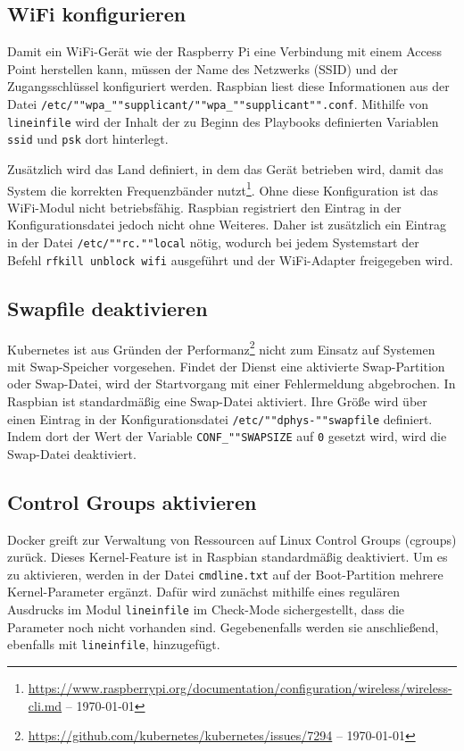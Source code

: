 \subsection{WiFi konfigurieren}\label{subsec:wifi-konfigurieren}

Damit ein WiFi-Gerät wie der Raspberry Pi eine Verbindung mit einem Access Point herstellen kann, müssen der Name des Netzwerks (SSID) und der Zugangsschlüssel konfiguriert werden.
Raspbian liest diese Informationen aus der Datei \texttt{/etc/""wpa\_""supplicant/""wpa\_""supplicant"".conf}.
Mithilfe von \texttt{lineinfile} wird der Inhalt der zu Beginn des Playbooks definierten Variablen \texttt{ssid} und \texttt{psk} dort hinterlegt.

Zusätzlich wird das Land definiert, in dem das Gerät betrieben wird, damit das System die korrekten Frequenzbänder nutzt\footnote{\url{https://www.raspberrypi.org/documentation/configuration/wireless/wireless-cli.md} -- \today}.
Ohne diese Konfiguration ist das WiFi-Modul nicht betriebsfähig.
Raspbian registriert den Eintrag in der Konfigurationsdatei jedoch nicht ohne Weiteres.
Daher ist zusätzlich ein Eintrag in der Datei \texttt{/etc/""rc.""local} nötig, wodurch bei jedem Systemstart der Befehl \texttt{rfkill unblock wifi} ausgeführt und der WiFi-Adapter freigegeben wird.

\subsection{Swapfile deaktivieren}\label{subsec:swapfile-deaktivieren}

Kubernetes ist aus Gründen der Performanz\footnote{\url{https://github.com/kubernetes/kubernetes/issues/7294} -- \today} nicht zum Einsatz auf Systemen mit Swap-Speicher vorgesehen.
Findet der Dienst eine aktivierte Swap-Partition oder Swap-Datei, wird der Startvorgang mit einer Fehlermeldung abgebrochen.
In Raspbian ist standardmäßig eine Swap-Datei aktiviert.
Ihre Größe wird über einen Eintrag in der Konfigurationsdatei \texttt{/etc/""dphys-""swapfile} definiert.
Indem dort der Wert der Variable \texttt{CONF\_""SWAPSIZE} auf \texttt{0} gesetzt wird, wird die Swap-Datei deaktiviert.

\subsection{Control Groups aktivieren}\label{subsec:control-groups-aktivieren}

Docker greift zur Verwaltung von Ressourcen auf Linux Control Groups (cgroups) zurück.
Dieses Kernel-Feature ist in Raspbian standardmäßig deaktiviert.
Um es zu aktivieren, werden in der Datei \texttt{cmdline.txt} auf der Boot-Partition mehrere Kernel-Parameter ergänzt.
Dafür wird zunächst mithilfe eines regulären Ausdrucks im Modul \texttt{lineinfile} im Check-Mode sichergestellt, dass die Parameter noch nicht vorhanden sind.
Gegebenenfalls werden sie anschließend, ebenfalls mit \texttt{lineinfile}, hinzugefügt.

